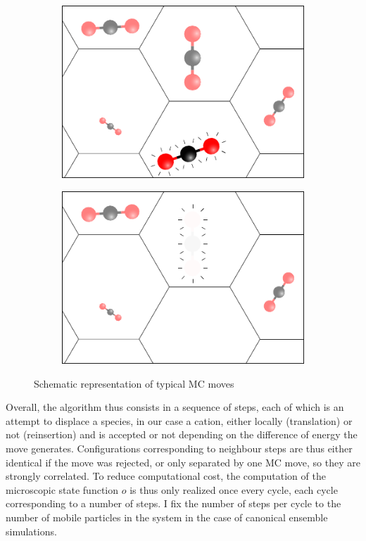 \documentclass[main.tex]{subfiles}
\begin{document}
\begin{figure}
	\begin{subfigure}{0.49\linewidth}
		\centering
		\includegraphics[width=\linewidth]{figures/cations/MC_insertion.pdf}
	\end{subfigure}\hfill%
	\begin{subfigure}{0.49\linewidth}
		\centering
		\includegraphics[width=\linewidth]{figures/cations/MC_deletion.pdf}
	\end{subfigure}

\vspace{2em}

	\caption{Schematic representation of typical MC moves}\label{fig:mcmoves}
\end{figure}

Overall, the algorithm thus consists in a sequence of steps, each of which is an attempt to displace a species, in our case a cation, either locally (translation) or not (reinsertion) and is accepted or not depending on the difference of energy the move generates. Configurations corresponding to neighbour steps are thus either identical if the move was rejected, or only separated by one MC move, so they are strongly correlated. To reduce computational cost, the computation of the microscopic state function $o$ is thus only realized once every cycle, each cycle corresponding to a number of steps. I fix the number of steps per cycle to the number of mobile particles in the system in the case of canonical ensemble simulations.
\end{document}
